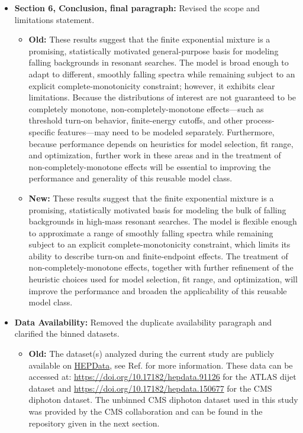 \documentclass[11pt,a4paper]{article}
\begin{document}
\begin{itemize}
    \item \textbf{Section 6, Conclusion, final paragraph:} Revised the scope and limitations statement.
    \begin{itemize}
        \item \textbf{Old:} These results suggest that the finite exponential mixture is a promising, statistically motivated general-purpose basis for modeling falling backgrounds in resonant searches. The model is broad enough to adapt to different, smoothly falling spectra while remaining subject to an explicit complete-monotonicity constraint; however, it exhibits clear limitations. Because the distributions of interest are not guaranteed to be completely monotone, non-completely-monotone effects---such as threshold turn-on behavior, finite-energy cutoffs, and other process-specific features---may need to be modeled separately. Furthermore, because performance depends on heuristics for model selection, fit range, and optimization, further work in these areas and in the treatment of non-completely-monotone effects will be essential to improving the performance and generality of this reusable model class.
        \item \textbf{New:} These results suggest that the finite exponential mixture is a promising, statistically motivated basis for modeling the bulk of falling backgrounds in high-mass resonant searches. The model is flexible enough to approximate a range of smoothly falling spectra while remaining subject to an explicit complete-monotonicity constraint, which limits its ability to describe turn-on and finite-endpoint effects. The treatment of non-completely-monotone effects, together with further refinement of the heuristic choices used for model selection, fit range, and optimization, will improve the performance and broaden the applicability of this reusable model class.
    \end{itemize}

    \item \textbf{Data Availability:} Removed the duplicate availability paragraph and clarified the binned datasets.
    \begin{itemize}
        \item \textbf{Old:} The dataset(s) analyzed during the current study are publicly available on \href{https://www.hepdata.net/}{HEPData}, see Ref. \cite{Maguire_2017} for more information. These data can be accessed at: \url{https://doi.org/10.17182/hepdata.91126} for the ATLAS dijet dataset and \url{https://doi.org/10.17182/hepdata.150677} for the CMS diphoton dataset. The unbinned CMS diphoton dataset used in this study was provided by the CMS collaboration and can be found in the repository given in the next section.


\end{itemize}
\end{itemize}
\end{document}
